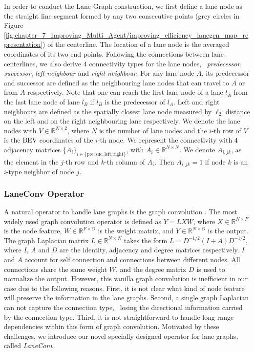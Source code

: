 In order to conduct the Lane Graph construction, we first define a lane node as the straight line segment formed by any two consecutive points (grey circles in Figure \ref{fig:chapter_7_Improving_Multi_Agent/improving_efficiency_lanegcn_map_representation}) of the centerline. The location of a lane node is the averaged coordinates of its two end points. Following the  connections between lane centerlines, we also derive $4$ connectivity types for the lane nodes, \ie \ \textit{predecessor}, \textit{successor}, \textit{left neighbour} and \textit{right neighbour}. For any lane node $A$, its predecessor and successor are defined as the neighbouring lane nodes that can travel to $A$ or from $A$ respectively. Note that one can reach the first lane node of a lane $l_{A}$ from the last lane node of lane $l_{B}$ if $l_{B}$ is the predecessor of $l_{A}$. Left and right neighbours are defined as the spatially closest lane node measured by $\ell_2$ distance on the left and on the right neighbouring lane respectively. We denote the lane nodes with $V \in \mathbb{R}^{N \times 2}$, where $N$ is the number of lane nodes and the $i$-th row of $V$ is the BEV coordinates of the $i$-th node. We represent the connectivity with $4$ adjacency matrices $\{A_i\}_{ i \in \{\text{pre}, \text{suc}, \text{left}, \text{right}\} }$, with $A_i \in \mathbb{R}^{N \times N}$. We denote $A_{i, jk}$, as the element in the $j$-th row and $k$-th column of $A_i$. Then  $A_{i, jk} = 1$ if node $k$ is an $i$-type neighbor of node $j$. 

\subsubsection{LaneConv Operator}
\label{subsubsec:7_improving_efficiency_lane_conv}

A natural operator to handle lane graphs is the graph convolution \cite{shuman2013emerging}.
The most widely used graph convolution operator \cite{kipf2016semi} is defined as $Y = LXW$, where $X \in \mathbb{R}^{N \times F}$ is the node feature, $W \in \mathbb{R}^{F \times O}$ is the weight matrix, and $Y \in \mathbb{R}^{N \times O}$ is the output. The graph Laplacian matrix $L \in \mathbb{R}^{N \times N}$ takes the form $L = D^{-1/2}(I + A)D^{-1/2}$, where $I$, $A$ and $D$ are the identity, adjacency and degree matrices respectively. $I$ and $A$ account for self connection and connections between different nodes. All connections share the same weight $W$, and the degree matrix $D$ is used to normalize the output. However, this vanilla graph convolution is inefficient in our case due to the following reasons. First, it is not clear what kind of node feature will preserve the information in the lane graphs. Second, a single graph Laplacian can not capture the connection type, \ie \ losing the directional information carried by the connection type. Third, it is not straightforward to handle long range dependencies within this form of graph convolution. Motivated by these challenges, we introduce our novel specially designed operator for lane graphs, called \textit{LaneConv}.

